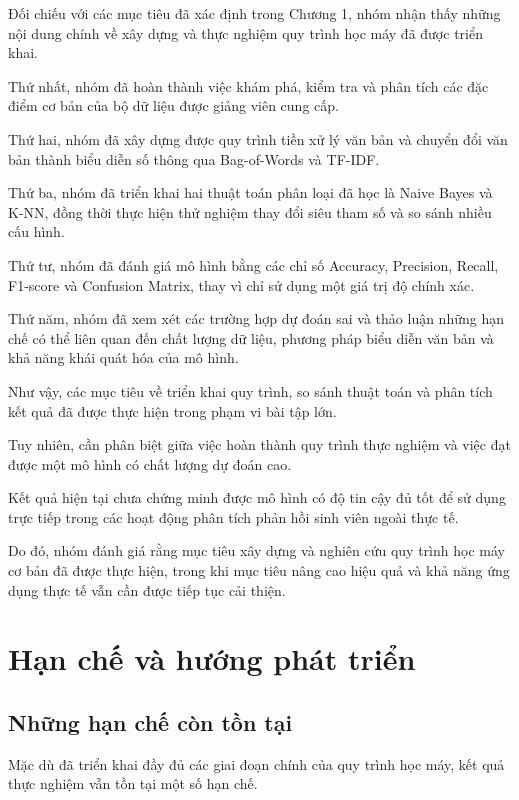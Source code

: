 Đối chiếu với các mục tiêu đã xác định
trong Chương 1, nhóm nhận thấy những
nội dung chính về xây dựng và thực nghiệm
quy trình học máy đã được triển khai.

Thứ nhất, nhóm đã hoàn thành việc khám phá,
kiểm tra và phân tích các đặc điểm cơ bản
của bộ dữ liệu được giảng viên cung cấp.

Thứ hai, nhóm đã xây dựng được quy trình
tiền xử lý văn bản và chuyển đổi văn bản
thành biểu diễn số thông qua Bag-of-Words
và TF-IDF.

Thứ ba, nhóm đã triển khai hai thuật toán
phân loại đã học là Naive Bayes và K-NN,
đồng thời thực hiện thử nghiệm thay đổi
siêu tham số và so sánh nhiều cấu hình.

Thứ tư, nhóm đã đánh giá mô hình bằng
các chỉ số Accuracy, Precision, Recall,
F1-score và Confusion Matrix, thay vì
chỉ sử dụng một giá trị độ chính xác.

Thứ năm, nhóm đã xem xét các trường hợp
dự đoán sai và thảo luận những hạn chế
có thể liên quan đến chất lượng dữ liệu,
phương pháp biểu diễn văn bản và
khả năng khái quát hóa của mô hình.

Như vậy, các mục tiêu về triển khai
quy trình, so sánh thuật toán và
phân tích kết quả đã được thực hiện
trong phạm vi bài tập lớn.

Tuy nhiên, cần phân biệt giữa việc hoàn
thành quy trình thực nghiệm và việc đạt
được một mô hình có chất lượng dự đoán cao.

Kết quả hiện tại chưa chứng minh được
mô hình có độ tin cậy đủ tốt để sử dụng
trực tiếp trong các hoạt động phân tích
phản hồi sinh viên ngoài thực tế.

Do đó, nhóm đánh giá rằng mục tiêu
xây dựng và nghiên cứu quy trình
học máy cơ bản đã được thực hiện,
trong khi mục tiêu nâng cao hiệu quả
và khả năng ứng dụng thực tế vẫn cần
được tiếp tục cải thiện.



\section{Hạn chế và hướng phát triển}

\subsection{Những hạn chế còn tồn tại}

Mặc dù đã triển khai đầy đủ các giai đoạn
chính của quy trình học máy, kết quả thực
nghiệm vẫn tồn tại một số hạn chế.

